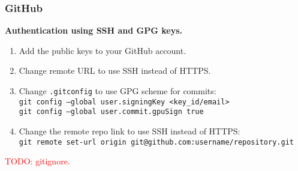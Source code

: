 \subsubsection*{GitHub}
\textbf{Authentication using SSH and GPG keys.}
\begin{enumerate}
\item Add the public keys to your GitHub account.\\
\item Change remote URL to use SSH instead of HTTPS.\\
\item Change \texttt{.gitconfig} to use GPG scheme for commits:\\
        \texttt{git config --global user.signingKey <key\_id/email>}\\
        \texttt{git config --global user.commit.gpuSign true}\\
\item Change the remote repo link to use SSH instead of HTTPS:\\
        \texttt{git remote set-url origin git@github.com:username/repository.git}
\end{enumerate}


\textcolor{red}{TODO: gitignore.}\\



\vfill \null
\pagebreak

